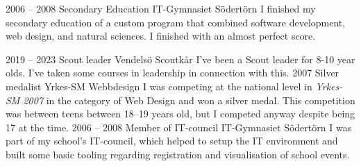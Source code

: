 \documentclass[9pt]{developercv} %
\begin{document}
\pagebreak



\begin{entrylist}
  \entry
    {2006 -- 2008}
    {Secondary Education}
    {IT-Gymnasiet Södertörn}
    {I finished my secondary education of a custom program that combined
      software development, web design, and natural sciences. I finished with
      an almost perfect score.}
\end{entrylist}



\begin{entrylist}
  \entry
    {2019 -- 2023}
    {Scout leader}
    {Vendelsö Scoutkår}
    {I've been a Scout leader for 8-10 year olds. I've taken some courses in
    leadership in connection with this.}
  \entry
    {2007}
    {Silver medalist}
    {Yrkes-SM Webbdesign}
    {I was competing at the national level in \textit{Yrkes-SM 2007} in the
      category of Web Design and won a silver medal. This competition was
      between teens between 18--19 years old, but I competed anyway despite
      being 17 at the time.}
  \entry
    {2006 -- 2008}
    {Member of IT-council}
    {IT-Gymnasiet Södertörn}
    {I was part of my school's IT-council, which helped to setup the IT
      environment and built some basic tooling regarding registration and
      visualisation of school events.}
\end{entrylist}

\end{document}
